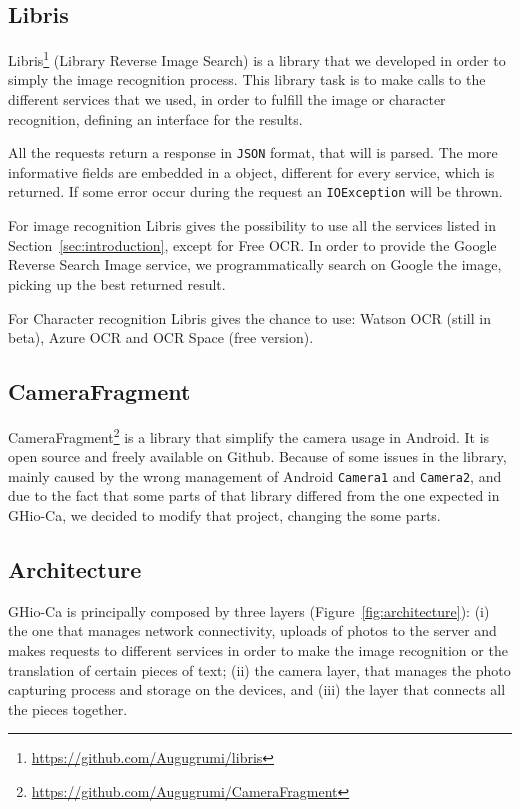 \subsection{Libris}
Libris\footnote{\url{https://github.com/Augugrumi/libris}} (Library Reverse Image Search) is a library that we developed in order to 
simply the image recognition process. This library task is to make calls to the different services that we used, in order to fulfill the image or character recognition, defining an interface for the results.

All the requests return a response in \texttt{JSON} format, that will is parsed. The more informative fields are embedded in a object, different for every service, which is returned. If some error occur during the request an \texttt{IOException} will be thrown.

For image recognition Libris gives the possibility to use all the services listed in Section~\ref{sec:introduction}, except for Free OCR. In order to provide the Google Reverse Search Image service, we programmatically search on Google the image, picking up the best returned result.

For Character recognition Libris gives the chance to use: Watson OCR (still in beta), Azure OCR and OCR Space (free version).

\subsection{CameraFragment}
CameraFragment\footnote{\url{https://github.com/Augugrumi/CameraFragment}} is a library that simplify the camera usage in Android. It is 
open source and freely available on Github. Because of some issues in the library, mainly caused by the wrong management of Android \texttt{Camera1} and \texttt{Camera2}, and due to the fact that some parts of that library differed from the one expected in GHio-Ca, we decided to modify that project, changing the some parts.

\subsection{Architecture}
GHio-Ca is principally composed by three layers (Figure~\ref{fig:architecture}): (i) the one that manages network connectivity, uploads of photos to the server and makes requests to different services in order to make the image recognition or the translation of certain pieces of text; (ii) the camera layer, that manages the photo capturing process and storage on the devices, and (iii) the layer that
connects all the pieces together. 

